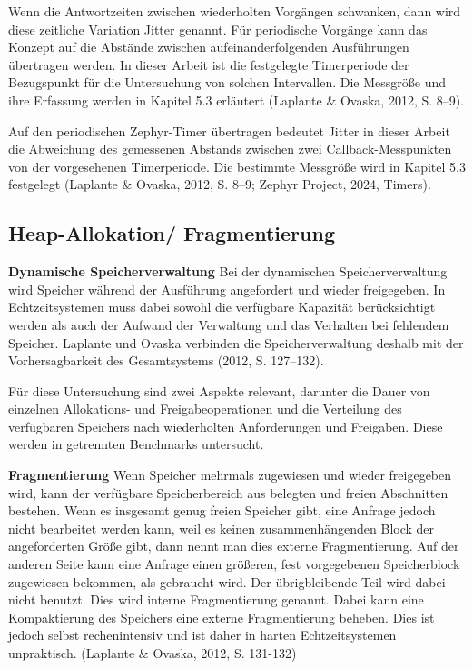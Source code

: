 Wenn die Antwortzeiten zwischen wiederholten Vorg{\"a}ngen schwanken, dann wird diese zeitliche Variation Jitter genannt. F{\"u}r periodische Vorg{\"a}nge kann das Konzept auf die Abst{\"a}nde zwischen aufeinanderfolgenden Ausf{\"u}hrungen {\"u}bertragen werden. In dieser Arbeit ist die festgelegte Timerperiode der Bezugspunkt f{\"u}r die Untersuchung von solchen Intervallen. Die Messgr{\"o}{\ss}e und ihre Erfassung werden in Kapitel 5.3 erl{\"a}utert (Laplante \& Ovaska, 2012, S. 8--9).

Auf den periodischen Zephyr-Timer {\"u}bertragen bedeutet Jitter in dieser Arbeit die Abweichung des gemessenen Abstands zwischen zwei Callback-Messpunkten von der vorgesehenen Timerperiode. Die bestimmte Messgr{\"o}{\ss}e wird in Kapitel 5.3 festgelegt (Laplante \& Ovaska, 2012, S. 8--9; Zephyr Project, 2024, \glqq{}Timers\grqq{}).

\subsection{Heap-Allokation/ Fragmentierung}
\textbf{Dynamische Speicherverwaltung }Bei der dynamischen Speicherverwaltung wird Speicher w{\"a}hrend der Ausf{\"u}hrung angefordert und wieder freigegeben. In Echtzeitsystemen muss dabei sowohl die verf{\"u}gbare Kapazit{\"a}t ber{\"u}cksichtigt werden als auch der Aufwand der Verwaltung und das Verhalten bei fehlendem Speicher. Laplante und Ovaska verbinden die Speicherverwaltung deshalb mit der Vorhersagbarkeit des Gesamtsystems (2012, S. 127--132).

F{\"u}r diese Untersuchung sind zwei Aspekte relevant, darunter die Dauer von einzelnen Allokations- und Freigabeoperationen und die Verteilung des verf{\"u}gbaren Speichers nach wiederholten Anforderungen und Freigaben. Diese werden in getrennten Benchmarks untersucht.

\textbf{Fragmentierung }Wenn Speicher mehrmals zugewiesen und wieder freigegeben wird, kann der verf{\"u}gbare Speicherbereich aus belegten und freien Abschnitten bestehen. Wenn es insgesamt genug freien Speicher gibt, eine Anfrage jedoch nicht bearbeitet werden kann, weil es keinen zusammenh{\"a}ngenden Block der angeforderten Gr{\"o}{\ss}e gibt, dann nennt man dies externe Fragmentierung. Auf der anderen Seite kann eine Anfrage einen gr{\"o}{\ss}eren, fest vorgegebenen Speicherblock zugewiesen bekommen, als gebraucht wird. Der {\"u}brigbleibende Teil wird dabei nicht benutzt. Dies wird interne Fragmentierung genannt. Dabei kann eine Kompaktierung des Speichers eine externe Fragmentierung beheben. Dies ist jedoch selbst rechenintensiv und ist daher in harten Echtzeitsystemen unpraktisch. (Laplante \& Ovaska, 2012, S. 131-132)

